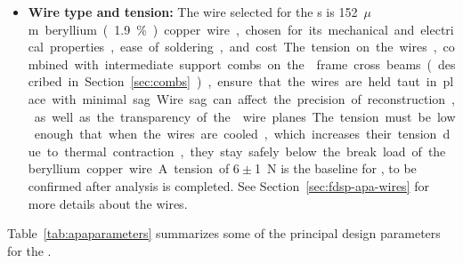 \begin{itemize}
\item \textbf{Wire type and tension:}  The wire selected for the s is \SI{152}{$\mu$m} beryllium (\num{1.9}\%) copper wire, %
chosen for its mechanical and electrical properties, ease of soldering, and cost.  The tension on the wires, combined with intermediate support combs on the  frame cross beams (described in Section~\ref{sec:combs}), ensure that the wires are held taut in place with minimal sag.  Wire sag can affect the precision of reconstruction, as well as the transparency of the  wire planes.  The tension must be low enough that when the wires are cooled, which increases their tension due to thermal contraction, they stay safely below the break load of the beryllium copper wire.  A tension of $6\pm$\SI{1}{N} is the baseline for , to be confirmed after  analysis is completed.  %
See Section~\ref{sec:fdsp-apa-wires} for more details about the  wires.

\end{itemize}

Table~\ref{tab:apaparameters} summarizes some of the principal design parameters for the  
.

